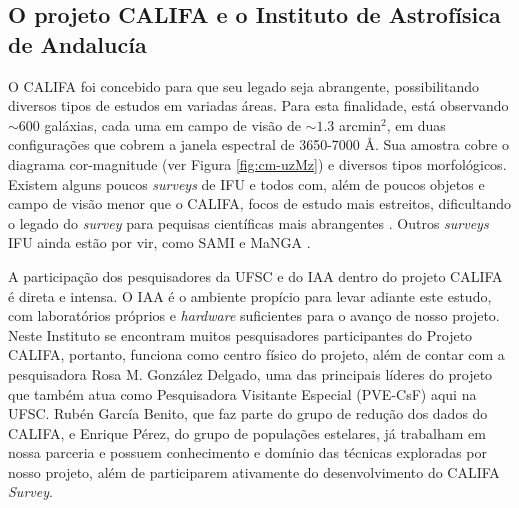 \documentclass[a4paper,12pt]{article}
\begin{document}
\subsection{O projeto CALIFA e o Instituto de Astrofísica de Andalucía}
\vspace{0.3cm}
O CALIFA foi concebido para que seu legado seja abrangente, possibilitando diversos tipos de estudos
em variadas áreas. Para esta finalidade, está observando $\sim 600$ galáxias, cada uma em campo de
visão de $\sim1.3$ arcmin$^2$, em duas configurações que cobrem a janela espectral de 3650-7000 \AA.
Sua amostra cobre o diagrama cor-magnitude (ver Figura \ref{fig:cm-uzMz}) e diversos tipos
morfológicos. Existem alguns poucos {\em surveys} de IFU e todos com, além de poucos objetos e campo
de visão menor que o CALIFA, focos de estudo mais estreitos, dificultando o legado do {\em survey}
para pequisas científicas mais abrangentes \citep[SAURON;][região central de 72 galáxias com $z <
0.01$.]{deZeeuw.etal.2002a} \citep[PINGS;][algumas galáxias muito próximas ($\sim 10$ Mpc) e o
estudo atual de 70 (U)LIRGs com $z <0.26$]{RosalesOrtega.etal.2010a} \citep[VENGA;][$30$ galáxias
espirais]{Blanc.etal.2010a} \citep[ATLAS\textsuperscript{3D};][260 galáxias {\em early-type}
próximas]{Cappellari.etal.2011a}. Outros {\em surveys} IFU ainda estão por vir, como SAMI
\citep{Croom.etal.2012a} e MaNGA \citep{Bundy.etal.2015a}.

A participação dos pesquisadores da UFSC e do IAA dentro do projeto CALIFA é direta e intensa. O IAA
é o ambiente propício para levar adiante este estudo, com laboratórios próprios e {\em hardware}
suficientes para o avanço de nosso projeto. Neste Instituto se encontram muitos pesquisadores
participantes do Projeto CALIFA, portanto, funciona como centro físico do projeto, além de contar
com a pesquisadora Rosa M. González Delgado, uma das principais líderes do projeto que também atua
como Pesquisadora Visitante Especial (PVE-CsF) aqui na UFSC. Rubén García Benito, que faz parte do
grupo de redução dos dados do CALIFA, e Enrique Pérez, do grupo de populações estelares, já
trabalham em nossa parceria e possuem conhecimento e domínio das técnicas exploradas por nosso
projeto, além de participarem ativamente do desenvolvimento do CALIFA {\em Survey}.
\end{document}
